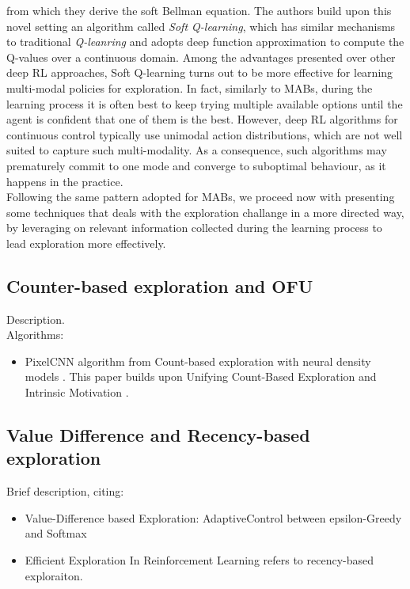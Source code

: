 from which they derive the soft Bellman equation. The authors build upon this novel setting an algorithm called \emph{Soft Q-learning}, which has similar mechanisms to traditional \emph{Q-leanring} and adopts deep function approximation to compute the Q-values over a continuous domain. Among the advantages presented over other deep \gls{RL} approaches, Soft Q-learning turns out to be more effective for learning multi-modal policies for exploration. In fact, similarly to \gls{MAB}s, during the learning process it is often best to keep trying multiple available options until the agent is confident that one of them is the best. However, deep \gls{RL} algorithms for continuous control typically use unimodal action distributions, which are not well suited to capture such multi-modality. As a consequence, such algorithms may prematurely commit to one mode and converge to suboptimal behaviour, as it happens in the practice. \\
Following the same pattern adopted for \gls{MAB}s, we proceed now with presenting some techniques that deals with the exploration challange in a more directed way, \ie by leveraging on relevant information collected during the learning process to lead exploration more effectively.

\subsection{Counter-based exploration and OFU}
Description. \\
Algorithms:
\begin{itemize}
\item  PixelCNN algorithm from Count-based exploration with neural density models \cite{ostrovski2017count}. This paper builds upon Unifying Count-Based Exploration and Intrinsic Motivation \cite{bellemare2016unifying}. %
\end{itemize}

\subsection{Value Difference and Recency-based exploration}
Brief description, citing:
\begin{itemize}
\item  Value-Difference based Exploration: AdaptiveControl between epsilon-Greedy and Softmax \cite{tokic2011value}
\item Efficient Exploration In Reinforcement Learning \cite{thrun1992efficient} refers to recency-based exploraiton.
\end{itemize}


